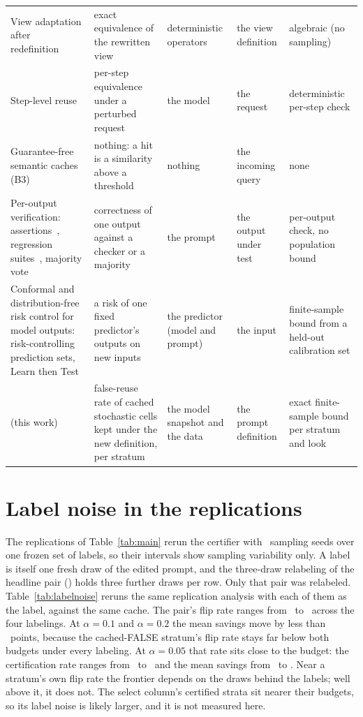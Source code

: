 \begin{table}[t]
\begin{tabular}{@{}>{\raggedright\arraybackslash}p{3.1cm}>{\raggedright\arraybackslash}p{4.0cm}>{\raggedright\arraybackslash}p{2.6cm}>{\raggedright\arraybackslash}p{3.2cm}>{\raggedright\arraybackslash}p{2.7cm}@{}}
View adaptation after redefinition~\cite{gupta95} & exact equivalence of the rewritten view & deterministic operators & the view definition & algebraic (no sampling) \\
Step-level reuse~\cite{stepcache} & per-step equivalence under a perturbed request & the model & the request & deterministic per-step check \\
Guarantee-free semantic caches~\cite{gptcache} (B3) & nothing: a hit is a similarity above a threshold & nothing & the incoming query & none \\
Per-output verification: assertions~\cite{spade}, regression suites~\cite{retain}, majority vote~\cite{selfconsistency} & correctness of one output against a checker or a majority & the prompt & the output under test & per-output check, no population bound \\
Conformal and distribution-free risk control for model outputs: risk-controlling prediction sets, Learn then Test~\cite{rcps,ltt} & a risk of one fixed predictor's outputs on new inputs & the predictor (model and prompt) & the input & finite-sample bound from a held-out calibration set \\
\sivm{} (this work) & false-reuse rate of cached stochastic cells kept under the new definition, per stratum & the model snapshot and the data & the prompt definition & exact finite-sample bound per stratum and look \\
\bottomrule
\end{tabular}
\end{table}

\FloatBarrier
\keepheading
\section{Label noise in the replications}
\label{app:labelnoise}
The replications of Table~\ref{tab:main} rerun the certifier with
\bootB\ sampling seeds over one frozen set of labels, so their intervals
show sampling variability only. A label is itself one fresh draw of the
edited prompt, and the three-draw relabeling of the headline pair
() holds three further draws per row. Only that
pair was relabeled.
Table~\ref{tab:labelnoise} reruns the same replication analysis with
each of them as the label, against the same cache. The pair's flip rate
ranges from \ to \ across the four
labelings. At $\alpha{=}0.1$ and $\alpha{=}0.2$ the mean savings move by
less than \ points, because the cached-FALSE stratum's
flip rate stays far below both budgets under every labeling. At
$\alpha{=}0.05$ that rate sits close to the budget: the certification
rate ranges from \ to \ and
the mean savings from \ to . Near a
stratum's own flip rate the frontier depends on the draws behind the
labels; well above it, it does not. The select column's certified strata
sit nearer their budgets, so its label noise is likely larger, and it is
not measured here.

